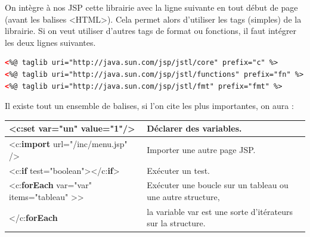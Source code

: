 On intègre à nos JSP cette librairie avec la ligne suivante en tout début de page (avant les balises <HTML>). Cela permet alors d'utiliser les tags (simples) de la librairie. Si on veut utiliser d'autres tags de format ou fonctions, il faut intégrer les deux lignes suivantes.
\begin{lstlisting}[language=XML]
<%@ taglib uri="http://java.sun.com/jsp/jstl/core" prefix="c" %>
<%@ taglib uri="http://java.sun.com/jsp/jstl/functions" prefix="fn" %>
<%@ taglib uri="http://java.sun.com/jsp/jstl/fmt" prefix="fmt" %>
\end{lstlisting}  

Il existe tout un ensemble de balises, si l'on cite les plus importantes, on aura :\\

\noindent
\begin{tabular}{|l|l|}
  \hline
      <c:\textbf{set} var="un" value="1"/> 		& Déclarer des variables. \\ 
  \hline 
      <c:\textbf{import} url="/inc/menu.jsp" /> 	& Importer une autre page JSP. \\
  \hline 
      <c:\textbf{if} test="boolean"></c:\textbf{if}> 	& Exécuter un test. \\
  \hline        					    
      <c:\textbf{forEach} var="var" items="tableau" >> 	& Exécuter une boucle sur un tableau ou une autre structure, \\
      </c:\textbf{forEach}				& la variable var est une sorte d'itérateurs sur la structure. \\
  \hline        					    
\end{tabular}
